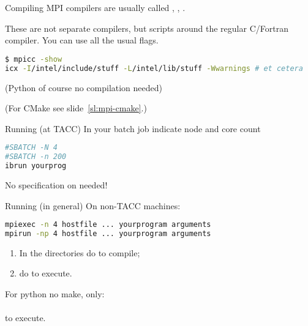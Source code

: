 \begin{numberedframe}{Compiling}
  MPI compilers are usually called ,
  , .

  These are not separate compilers,
  but scripts around the regular C/Fortran compiler. You can use all
  the usual flags.
\begin{lstlisting}[language=bash,numbers=none]
$ mpicc -show
icx -I/intel/include/stuff -L/intel/lib/stuff -Wwarnings # et cetera
\end{lstlisting}
(Python of course no compilation needed)

  (For CMake see slide~\ref{sl:mpi-cmake}.)
\end{numberedframe}

\begin{tacc}
\begin{numberedframe}{Running (at TACC)}
  In your batch job indicate node and core count
\begin{lstlisting}[language=bash]
#SBATCH -N 4
#SBATCH -n 200
ibrun yourprog
\end{lstlisting}
No specification on  needed!
\end{numberedframe}
\end{tacc}

\begin{numberedframe}{Running (in general)}
On non-TACC machines:
\begin{lstlisting}[language=bash,numbers=none]
mpiexec -n 4 hostfile ... yourprogram arguments
mpirun -np 4 hostfile ... yourprogram arguments
\end{lstlisting}
\end{numberedframe}

\begin{exerciseframe}[hello]
  

  \begin{enumerate}
  \item In the directories  do 
     to compile;
  \item do  to execute.
  \end{enumerate}

\begin{python}
  \begin{pythonnote}
    For python no make, only:\\
    \\
    to execute.
  \end{pythonnote}
\end{python}

\end{exerciseframe}


